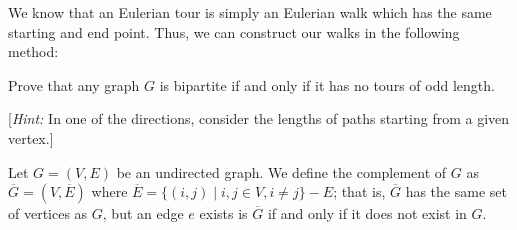 \documentclass[11pt]{article}
\begin{document}
\begin{Parts}

\begin{solution}
    We know that an Eulerian tour is simply an Eulerian walk which has the same starting and end point. Thus, we can construct our walks in the following method: 


\end{solution}

\Part Prove that any graph $G$ is bipartite if and only if it has no tours of odd length.

[\emph{Hint:} In one of the directions, consider the lengths of paths starting from a given vertex.]
\end{Parts}
\pagebreak
{}

Let $G = (V, E)$ be an undirected graph.  We define the complement of $G$ as $\overline{G} = (V, \overline{E})$ where $\overline{E} = \{(i,j) \mid i,j \in V, i \neq j\} - E$; that is, $\overline{G}$ has the same set of vertices as $G$, but an edge $e$ exists is $\overline{G}$ if and only if it does not exist in $G$.
\end{document}
